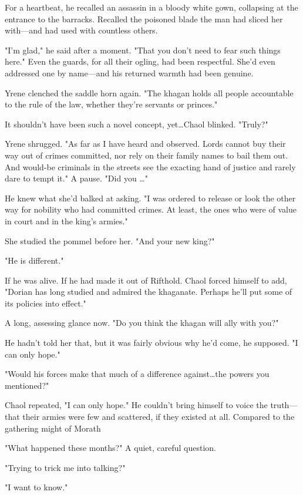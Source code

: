 For a heartbeat, he recalled an assassin in a bloody white gown, collapsing at the entrance to the barracks.
Recalled the poisoned blade the man had sliced her with---and had used with countless others.

"I'm glad," he said after a moment.
"That you don't need to fear such things here."
Even the guards, for all their ogling, had been respectful.
She'd even addressed one by name---and his returned warmth had been genuine.

Yrene clenched the saddle horn again.
"The khagan holds all people accountable to the rule of the law, whether they're servants or princes."

It shouldn't have been such a novel concept, yet\ldots Chaol blinked.
"Truly?"

Yrene shrugged.
"As far as I have heard and observed.
Lords cannot buy their way out of crimes committed, nor rely on their family names to bail them out.
And would-be criminals in the streets see the exacting hand of justice and rarely dare to tempt it."
A pause.
"Did you \ldots"

He knew what she'd balked at asking.
"I was ordered to release or look the other way for nobility who had committed crimes.
At least, the ones who were of value in court and in the king's armies."

She studied the pommel before her.
"And your new king?"

"He is different."

If he was alive.
If he had made it out of Rifthold.
Chaol forced himself to add, "Dorian has long studied and admired the khaganate.
Perhaps he'll put some of its policies into effect."

A long, assessing glance now.
"Do you think the khagan will ally with you?"

He hadn't told her that, but it was fairly obvious why he'd come, he supposed.
"I can only hope."

"Would his forces make that much of a difference against\ldots the powers you mentioned?"

Chaol repeated, "I can only hope."
He couldn't bring himself to voice the truth---that their armies were few and scattered, if they existed at all.
Compared to the gathering might of Morath 

"What happened these months?"
A quiet, careful question.

"Trying to trick me into talking?"

"I want to know."


